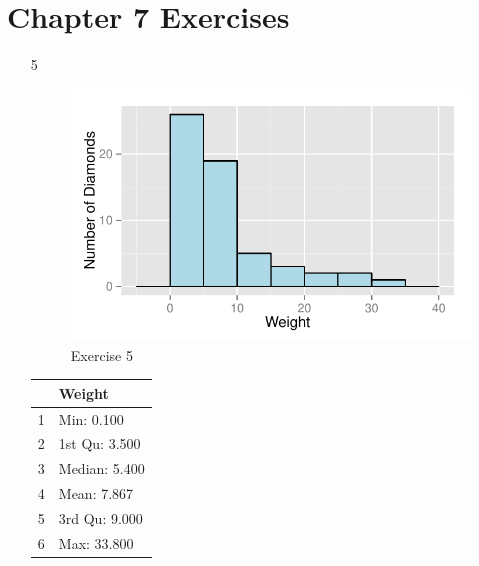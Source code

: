 \documentclass[letterpaper, landscape]{exam}
\begin{document}
  \section{Chapter 7 Exercises}
  \begin{enumerate}
    \item[5]
      \begin{figure}[H]
        \centering
        \includegraphics[scale = 0.8]{figures/ex05.pdf}
        \caption{Exercise 5}
      \end{figure}

      \begin{table}[H]
        \centering
        \begin{tabular}{rl}
          \toprule
                   & Weight \\
          \midrule
          1        & Min: 0.100   \\
          2        & 1st Qu: 3.500   \\
          3        & Median: 5.400   \\
          4        & Mean: 7.867   \\
          5        & 3rd Qu: 9.000   \\
          6        & Max: 33.800   \\
          \bottomrule
        \end{tabular}
      \end{table}


\end{enumerate}
\end{document}
